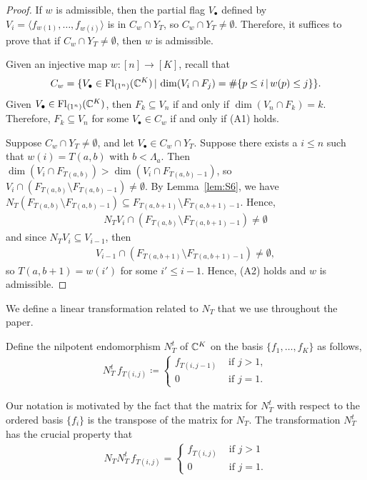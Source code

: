 \documentclass[12pt]{amsart}
\newcommand{\st}{\,|\,}
\newcommand{\Fl}{\mathrm{Fl}}
\begin{document}
\begin{proof}
If $w$ is admissible, then the partial flag $V_\bullet$ defined by $V_i=\langle f_{w(1)}, \ldots, f_{w(i)}\rangle$ is in $C_w\cap Y_{T}$, so $C_w\cap Y_{T} \neq \emptyset$. Therefore, it suffices to prove that if $C_w\cap Y_{T}\neq\emptyset$, then $w$ is admissible.

Given an injective map $w: [n]\to [K]$, recall that 
\begin{align}
    C_w = \{V_\bullet \in \Fl_{(1^n)}(\bC^K) \st \dim(V_i\cap F_j) = \#\{p\leq i \st w(p)\leq j\}\}.
\end{align}
Given $V_\bullet\in \Fl_{(1^n)}(\bC^K)$, then $F_k\subseteq V_n$ if and only if $\dim(V_n\cap F_k) = k$. Therefore, $F_k\subseteq V_n$ for some $V_\bullet\in C_w$ if and only if (A1) holds.

Suppose $C_w\cap Y_{T}\neq\emptyset$, and let $V_\bullet \in C_w\cap Y_{T}$. Suppose there exists a $i\leq n$ such that $w(i) = T(a,b)$ with $b<\Lambda_a$.
Then $\dim(V_i\cap F_{T(a,b)})>\dim(V_i\cap F_{T(a,b)-1})$, so $V_i\cap (F_{T(a,b)}\setminus F_{T(a,b)-1})\neq\emptyset$.  By Lemma~\ref{lem:S6}, we have $N_T (F_{T(a,b)}\setminus F_{T(a,b)-1}) \subseteq F_{T(a,b+1)}\setminus F_{T(a,b+1)-1}$. Hence,
\begin{align}
    N_T V_i \cap (F_{T(a,b)} \setminus F_{T(a,b+1)-1}) \neq \emptyset
\end{align}
and since $N_T V_i\subseteq V_{i-1}$, then
\begin{align}
    V_{i-1} \cap (F_{T(a,b+1)}\setminus F_{T(a,b+1)-1}) \neq \emptyset,
\end{align}
so $T(a,b+1)=w(i')$ for some $i'\leq i-1$. Hence, (A2) holds and $w$ is admissible.
\end{proof}

We define a linear transformation related to $N_T$ that we use throughout the paper.
\begin{definition}\label{def:NTranspose}
Define the nilpotent endomorphism $N^t_T$ of $\mathbb{C}^K$ on the basis $\{f_1,\dots, f_K\}$ as follows,
\begin{align}
N^t_T \,f_{T(i,j)} \coloneqq \begin{cases} f_{T(i,j-1)} & \text{ if } j>1,\\ 0 & \text{ if }j = 1.\end{cases}
\end{align}
\end{definition}
Our notation is motivated by the fact that the matrix for $N^t_T$ with respect to the ordered basis $\{f_i\}$ is the transpose of the matrix for $N_T$. The transformation $N^t_T$ has the crucial property that 
\begin{align}\label{eq:NNTranspose}
N_TN^t_T \,f_{T(i,j)} = \begin{cases} f_{T(i,j)} &\text{ if } j > 1\\ 0 &\text{ if } j = 1.\end{cases}
\end{align}
\end{document}
